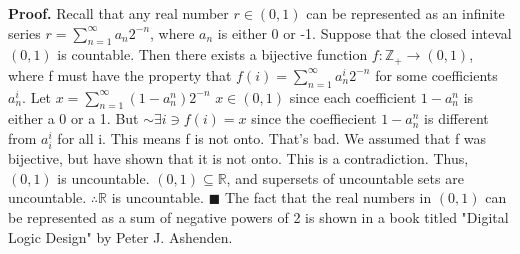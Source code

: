 \documentclass[12pt]{article}
\begin{document}
	\textbf{Proof.}
	\newline
	Recall that any real number \(r \in (0,1)\) can be represented as an infinite series \(r=\sum_{n=1}^{\infty}a_n2^{-n}\), where \(a_n\) is either 0 or -1.
	\newline \newline
	Suppose that the closed inteval \((0,1)\) is countable. \newline
	Then there exists a bijective function \(f: \mathbb{Z}_+ \rightarrow (0,1)\), where f must have the property that \(f(i) = \sum_{n=1}^{\infty}a_n^i2^{-n}\) for some coefficients \(a_n^i\).
	\newline \newline
	Let \(x = \sum_{n=1}^{\infty}(1-a_n^n)2^{-n}\) \newline
	\(x \in (0,1)\) since each coefficient \(1-a_n^n\) is either a 0 or a 1. \newline \newline
	But \(\sim \exists i \ni f(i) = x\) since the coeffiecient \(1-a_n^n\) is different from \(a_i^i\) for all i. This means f is not onto. That's bad.
	\newline \newline
	We assumed that f was bijective, but have shown that it is not onto. This is a contradiction. \newline
	Thus, \((0,1)\) is uncountable. \newline
	\((0,1) \subseteq \mathbb{R}\), and supersets of uncountable sets are uncountable. \newline \newline
	\(\therefore \mathbb{R}\) is uncountable.
	\newline \(\blacksquare\) \newline \newline
	The fact that the real numbers in \((0,1)\) can be represented as a sum of negative powers of 2 is shown in a book titled "Digital Logic Design" by Peter J. Ashenden.
\end{document}
